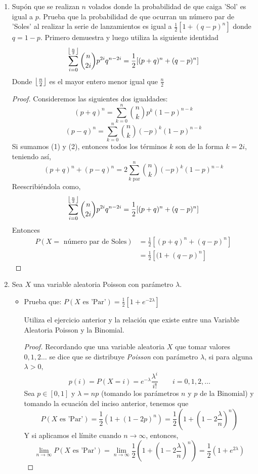 \documentclass[11pt,letterpaper]{report}
\DeclarePairedDelimiter\floor{\lfloor}{\rfloor}
\begin{document}
\begin{enumerate}
\item Supón que se realizan $n$ volados donde la probabilidad de que caiga 'Sol' es igual a $p$.
Prueba que la probabilidad de que ocurran un número par de 'Soles' al realizar la serie de lanzamientos es igual a
$\frac{1}{2}[1+(q-p)^n]$ donde $q=1-p$. Primero demuestra y luego utiliza la siguiente identidad
\[
    \sum_{i=0}^{\floor*{\frac{n}{2}}} \binom{n}{2i} p^{2i} q^{n-2i} = 
        \frac{1}{2}[(p+q)^n + (q-p)^n]
\]
Donde $\floor*{\frac{n}{2}}$ es el mayor entero menor igual que $\frac{n}{2}$

\begin{proof}
    Consideremos las siguientes dos igualdades:
    \[
        (p+q)^n = \sum_{k=0}^{n} \binom{n}{k} p^k (1-p)^{n-k}\tag{1}
        \]
    \[
        (p-q)^n = \sum_{k=0}^{n} \binom{n}{k} (-p)^k (1-p)^{n-k}   \tag{2}
    \]
    Si sumamos (1) y (2), entonces todos los términos $k$ son de la forma $k=2i$, teniendo así,
    \[
        (p+q)^n + (p-q)^n = 2 \sum_{k \text{ par}}^{n} \binom{n}{k} (-p)^k (1-p)^{n-k}
    \]
    Reescribiéndola como,
    \[
        \sum_{i=0}^{\floor*{\frac{n}{2}}} \binom{n}{2i} p^{2i} q^{n-2i} = 
            \frac{1}{2}[(p+q)^n + (q-p)^n]
    \]
    Entonces
    \begin{align*}
        P(X = \text{ número par de Soles})
            &= \frac{1}{2} [(p+q)^n + (q-p)^n]\\
            &= \frac{1}{2} [(1 + (q-p)^n]
    \end{align*}


\end{proof}

\item Sea $X$ una variable aleatoria Poisson con parámetro $\lambda$.
\begin{itemize}
    \item Prueba que: $P(X \text{ es 'Par'}) = \frac{1}{2}[1+e^{-2\lambda}]$
    
    Utiliza el ejercicio anterior y la relación que existe entre una Variable Aleatoria Poisson y la Binomial.

    \begin{proof}
        Recordando que una variable aleatoria $X$ que tomar valores $0,1,2\ldots$ se dice que se distribuye
        \emph{Poisson} con parámetro $\lambda$, si para alguna $\lambda > 0,$
        \[
            p(i) = P(X=i) = e^{-\lambda}\frac{\lambda^{i}}{i!} \qquad i = 0,1,2,\ldots
        \]
        Sea $p\in[0,1]$ y $\lambda=np$ (tomando los parámetros $n$ y $p$ de la Binomial) y tomando la ecuación del 
        inciso anterior, tenemos que
        \[
            P(X \text{ es 'Par'}) = \frac{1}{2}(1+(1-2p)^n) = \frac{1}{2}(1+(1-2\frac{\lambda}{n})^n)
        \]
        Y si aplicamos el límite cuando $n \to \infty$, entonces,
        \[
            \lim_{n \to \infty}P(X \text{ es 'Par'}) = \lim_{n \to \infty} \frac{1}{2}(1+(1-2\frac{\lambda}{n})^n) =
                \frac{1}{2}(1+e^{2\lambda})
        \]
    \end{proof}
    

\end{itemize}
\end{enumerate}
\end{document}
